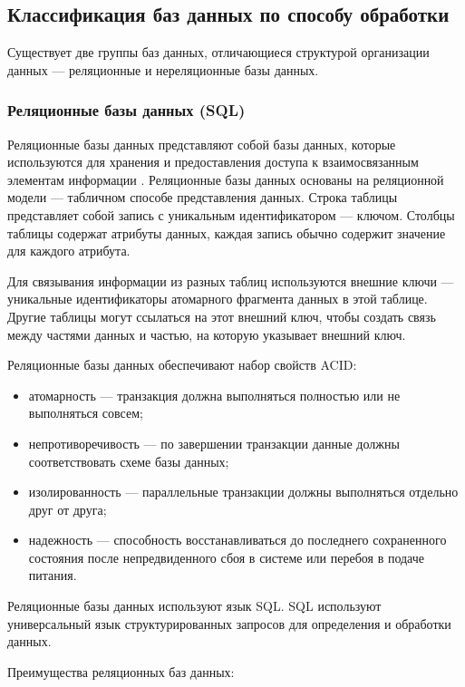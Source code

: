 \subsection{Классификация баз данных по способу обработки}

Существует две группы баз данных, отличающиеся структурой организации данных --- реляционные и нереляционные базы данных.

\subsubsection{Реляционные базы данных (SQL)}

Реляционные базы данных представляют собой базы данных, которые используются для хранения и предоставления доступа к взаимосвязанным элементам информации \cite{sql}. Реляционные базы данных основаны на реляционной модели --- табличном способе представления данных. Строка таблицы представляет собой запись с уникальным идентификатором --- ключом. Столбцы таблицы содержат атрибуты данных, каждая запись обычно содержит значение для каждого атрибута. 

Для связывания информации из разных таблиц используются внешние ключи --- уникальные идентификаторы атомарного фрагмента данных в этой таблице. Другие таблицы могут ссылаться на этот внешний ключ, чтобы создать связь между частями данных и частью, на которую указывает внешний ключ.

Реляционные базы данных обеспечивают набор свойств ACID:

\begin{itemize}
	\item атомарность --- транзакция должна выполняться полностью или не выполняться совсем;
	\item непротиворечивость --- по завершении транзакции данные должны соответствовать схеме базы данных;
	\item изолированность --- параллельные транзакции должны выполняться отдельно друг от друга;
	\item надежность --- способность восстанавливаться до последнего сохраненного состояния после непредвиденного сбоя в системе или перебоя в подаче питания.
\end{itemize}

Реляционные базы данных используют язык SQL. SQL используют универсальный язык структурированных запросов для определения и обработки данных.

Преимущества реляционных баз данных:

